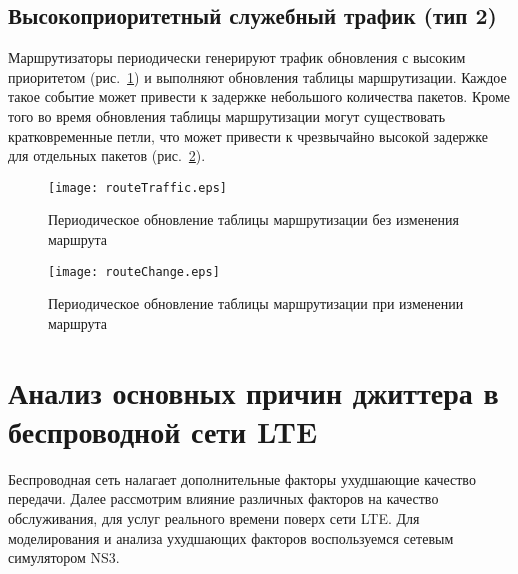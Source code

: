 \subsection{Высокоприоритетный служебный трафик (тип 2) } \label{subsect2_1_7}
Маршрутизаторы периодически генерируют трафик обновления с высоким приоритетом (рис. \ref{img:routeTraffic}) и выполняют обновления таблицы маршрутизации. Каждое такое событие может привести к задержке небольшого количества пакетов. Кроме того во время обновления таблицы маршрутизации могут существовать кратковременные петли, что может привести к чрезвычайно высокой задержке для отдельных пакетов (рис. \ref{img:routeChange}).

\begin{figure} [h]
  \center
\texttt{[image: routeTraffic.eps]}
  \caption{Периодическое обновление таблицы маршрутизации без изменения маршрута \cite{clark}}
  \label{img:routeTraffic}
\end{figure}
\begin{figure} [h]
  \center
\texttt{[image: routeChange.eps]}
  \caption{Периодическое обновление таблицы маршрутизации при изменении маршрута \cite{clark}}
  \label{img:routeChange}
\end{figure}

\section{Анализ основных причин джиттера в беспроводной сети LTE} \label{sect2_2}
Беспроводная сеть налагает дополнительные факторы ухудшающие качество передачи. Далее рассмотрим влияние различных факторов на качество обслуживания, для услуг реального времени поверх сети LTE. Для моделирования и анализа ухудшающих факторов воспользуемся сетевым симулятором NS3.

